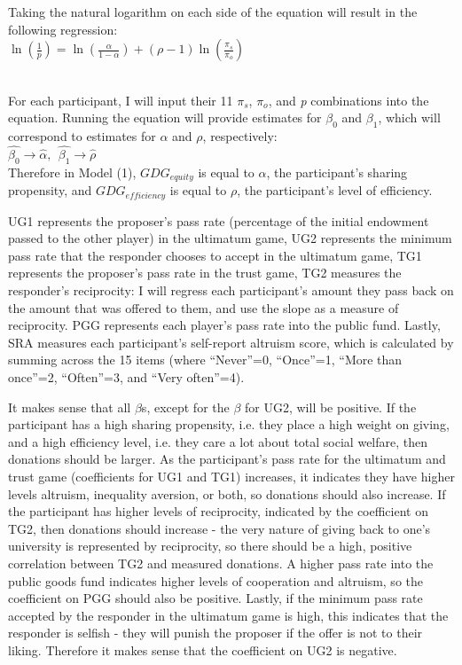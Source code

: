\documentclass{article}
\begin{document}
\noindent
Taking the natural logarithm on each side of the equation will result in the following regression:  \\

\indent
\( \ln(\frac{1}{p}) = \ln(\frac{\alpha}{1-\alpha})+(\rho-1)\ln(\frac{\pi_{s}}{\pi_{o}}) \)

\noindent
\\
For each participant, I will input their 11 \(\pi_{s}\), \(\pi_{o}\), and \textit{p} combinations into the equation. Running the equation will provide estimates for \(\beta_{0}\) and \(\beta_{1}\), which will correspond to estimates for \(\alpha\) and \(\rho\), respectively: \\

\(\hat{\beta_{0}} \rightarrow \hat{\alpha}, \ \  \hat{\beta_{1}} \rightarrow \hat{\rho} \) \\

Therefore in Model (1), \(GDG_{equity}\) is equal to \(\alpha\), the participant's sharing propensity, and \(GDG_{efficiency}\) is equal to \(\rho\), the participant's level of efficiency. 

UG1 represents the proposer\rq s pass rate (percentage of the initial endowment passed to the other player) in the ultimatum game, UG2 represents the minimum pass rate that the responder chooses to accept in the ultimatum game, TG1 represents the proposer\rq s pass rate in the trust game, TG2 measures the responder\rq s reciprocity: I will regress each participant's amount they pass back on the amount that was offered to them, and use the slope as a measure of reciprocity. PGG represents each player\rq s pass rate into the public fund. Lastly, SRA measures each participant\rq s self-report altruism score, which is calculated by summing across the 15 items (where ``Never''=0, ``Once''=1, ``More than once''=2, ``Often''=3, and ``Very often''=4).  

It makes sense that all \(\beta\)s, except for the \(\beta\) for UG2, will be positive. If the participant has a high sharing propensity, i.e. they place a high weight on giving, and a high efficiency level, i.e. they care a lot about total social welfare, then donations should be larger. As the participant\rq s pass rate for the ultimatum and trust game (coefficients for UG1 and TG1) increases, it indicates they have higher levels altruism, inequality aversion, or both, so donations should also increase. If the participant has higher levels of reciprocity, indicated by the coefficient on TG2, then donations should increase - the very nature of giving back to one's university is represented by reciprocity, so there should be a high, positive correlation between TG2 and measured donations. A higher pass rate into the public goods fund indicates higher levels of cooperation and altruism, so the coefficient on PGG should also be positive. Lastly, if the minimum pass rate accepted by the responder in the ultimatum game is high, this indicates that the responder is selfish - they will punish the proposer if the offer is not to their liking. Therefore it makes sense that the coefficient on UG2 is negative. 
\end{document}
